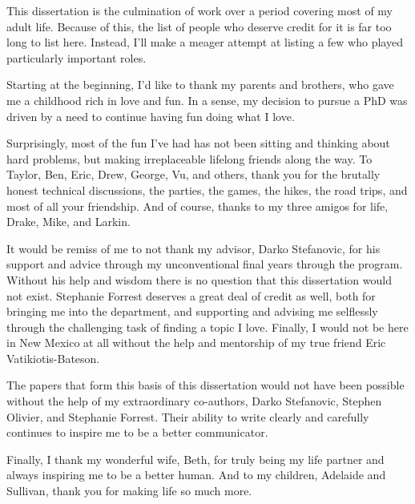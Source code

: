 \documentclass[botnum, fleqn]{unmeethesis}
\begin{document}
\begin{acknowledgments}
  \vspace{1.1in}
  This dissertation is the culmination of work over a period covering most of my
  adult life. Because of this, the list of people who deserve credit for it is
  far too long to list here. Instead, I'll make a meager attempt at listing a
  few who played particularly important roles. 

  Starting at the beginning, I'd like to thank my parents and brothers, who gave
  me a childhood rich in love and fun. In a sense, my decision to pursue a PhD
  was driven by a need to continue having fun doing what I love.  

  Surprisingly, most of the fun I've had has not been sitting and thinking about
  hard problems, but making irreplaceable lifelong friends along the way. To
  Taylor, Ben, Eric, Drew, George, Vu, and others, thank you for the brutally
  honest technical discussions, the parties, the games, the hikes, the road
  trips, and most of all your friendship. And of course, thanks to my three
  amigos for life, Drake, Mike, and Larkin. 

  It would be remiss of me to not thank my advisor, Darko Stefanovic, for his
  support and advice through my unconventional final years through the program.
  Without his help and wisdom there is no question that this dissertation would
  not exist. Stephanie Forrest deserves a great deal of credit as well, both for
  bringing me into the department, and supporting and advising me selflessly
  through the challenging task of finding a topic I love. Finally, I would not
  be here in New Mexico at all without the help and mentorship of my true friend
  Eric Vatikiotis-Bateson.

  The papers that form this basis of this dissertation would not have been
  possible without the help of my extraordinary co-authors, Darko Stefanovic,
  Stephen Olivier, and Stephanie Forrest. Their ability to write clearly and
  carefully continues to inspire me to be a better communicator. 

  Finally, I thank my wonderful wife, Beth, for truly being my life partner and
  always inspiring me to be a better human. And to my children, Adelaide and
  Sullivan, thank you for making life so much more.
 
\end{acknowledgments}

\maketitleabstract %
\end{document}
